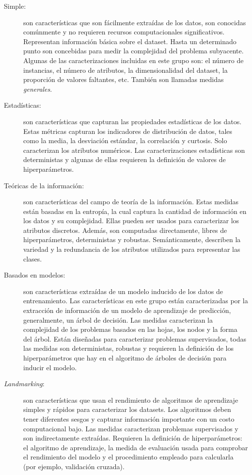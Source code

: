 \begin{description}
	\item[Simple:] son características que son fácilmente extraídas de los datos, son conocidas comúnmente y no requieren recursos computacionales significativos. Representan información básica sobre el dataset. Hasta un determinado punto son concebidas para medir la complejidad del problema subyacente. Algunas de las caracterizaciones incluidas en este grupo son: el número de instancias, el número de atributos, la dimensionalidad del dataset, la proporción de valores faltantes, etc. También son llamadas medidas \textit{generales}.
	
	\item[Estadísticas:] son características que capturan las propiedades estadísticas de los datos. Estas métricas capturan los indicadores de distribución de datos, tales como la media, la desviación estándar, la correlación y curtosis. Solo caracterizan los atributos numéricos. Las caracterizaciones estadísticas son deterministas y algunas de ellas requieren la definición de valores de hiperparámetros. %
	
	\item[Teóricas de la información:] son características del campo de teoría de la información. Estas medidas están basadas en la entropía, la cual captura la cantidad de información en los datos y su complejidad. Ellas pueden ser usados para caracterizar los atributos discretos. Además, son computadas directamente, libres de hiperparámetros, deterministas y robustas. Semánticamente, describen la variedad y la redundancia de los atributos utilizados para representar las clases.
	
	\item[Basados en modelos:] son características extraídas de un modelo inducido de los datos de entrenamiento. Las características en este grupo están caracterizadas por la extracción de información de un modelo de aprendizaje de predicción, generalmente, un árbol de decisión. Las medidas caracterizan la complejidad de los problemas basados en las hojas, los nodos y la forma del árbol. Están diseñadas para caracterizar problemas supervisados, todas las medidas son deterministas, robustas y requieren la definición de los hiperparámetros que hay en el algoritmo de árboles de decisión para inducir el modelo.
	
	\item[\textit{Landmarking}:] son características que usan el rendimiento de algoritmos de aprendizaje simples y rápidos para caracterizar los datasets. Los algoritmos deben tener diferentes sesgos y capturar información importante con un costo computacional bajo. Las medidas caracterizan problemas supervisados y son indirectamente extraídas. Requieren la definición de hiperparámetros: el algoritmo de aprendizaje, la medida de evaluación usada para comprobar el rendimiento del modelo y el procedimiento empleado para calcularla (por ejemplo, validación cruzada).
\end{description}

